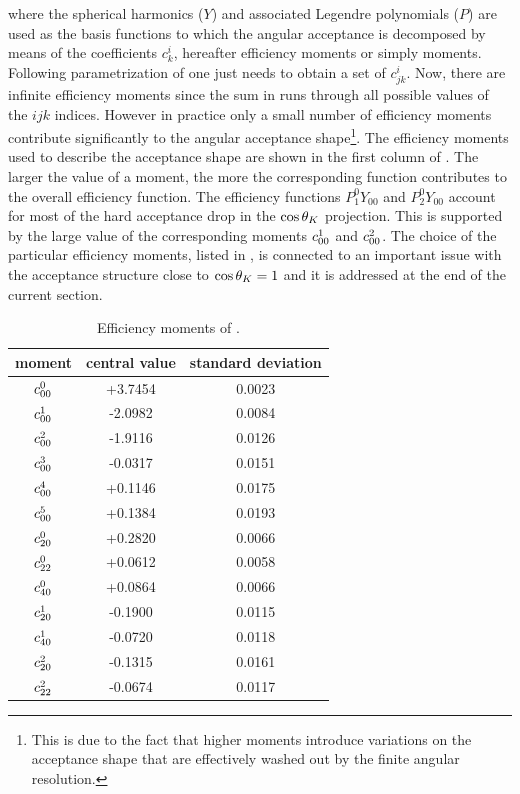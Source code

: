 \noindent where the spherical harmonics ($Y$) and associated Legendre polynomials ($P$) are used as the basis
functions to which the angular acceptance is decomposed by means of the coefficients $c^i_{k}$, hereafter efficiency moments or simply moments.
Following parametrization of  one just needs to obtain a set of $c^i_{jk}$. Now, there are infinite efficiency moments
since the sum in  runs through all possible values of the $ijk$ indices. However in practice only a small number of efficiency moments
contribute significantly to the angular acceptance shape\footnote{This is due to the fact that higher moments introduce
variations on the acceptance shape that are effectively washed out by the finite angular resolution.}.
The efficiency moments used to describe the acceptance shape are shown in the first column of .
The larger the value of a moment, the more the corresponding function contributes to the overall efficiency function.
The efficiency functions $P_1^0Y_{00}$ and $P_2^0Y_{00}$ account for most of the hard acceptance drop in the $\cos\theta_{K}$ projection.
This is supported by the large value of the corresponding moments $c^{1}_{00}$ and $c^{2}_{00}$.
The choice of the particular efficiency moments, listed in , is connected to an important
issue with the acceptance structure close to $\cos\theta_{K}=1$ and it is addressed at the end of the current section.

\begin{table}[!t]
  \centering
  \renewcommand{\arraystretch}{1.2}
  \begin{tabular}{ccc}
    \hline
    moment & central value & standard deviation \\
    \hline
  $c^{0}_{00}$   & +3.7454  &  0.0023  \\
  $c^{1}_{00}$   & -2.0982  &  0.0084  \\
  $c^{2}_{00}$   & -1.9116  &  0.0126  \\
  $c^{3}_{00}$   & -0.0317  &  0.0151  \\
  $c^{4}_{00}$   & +0.1146  &  0.0175  \\
  $c^{5}_{00}$   & +0.1384  &  0.0193  \\
  $c^{0}_{20}$   & +0.2820  &  0.0066  \\
  $c^{0}_{22}$   & +0.0612  &  0.0058  \\
  $c^{0}_{40}$   & +0.0864  &  0.0066  \\
  $c^{1}_{20}$   & -0.1900  &  0.0115  \\
  $c^{1}_{40}$   & -0.0720  &  0.0118  \\
  $c^{2}_{20}$   & -0.1315  &  0.0161  \\
  $c^{2}_{22}$   & -0.0674  &  0.0117  \\
  \hline
  \end{tabular}
  \caption{Efficiency moments of \BsJpsiKst.}
   \label{eff_moms_table}
\end{table}

